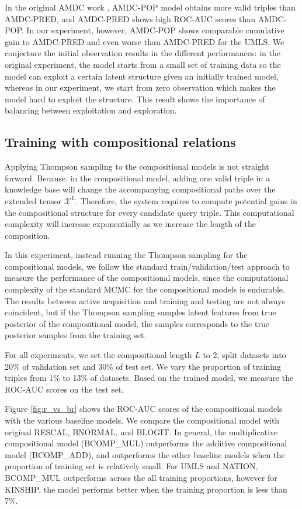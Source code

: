 In the original AMDC work \cite{kajino2015active}, AMDC-POP model obtains more 
valid triples than AMDC-PRED, and AMDC-PRED shows high ROC-AUC scores than AMDC-POP. 
In our experiment, however, AMDC-POP shows comparable cumulative gain to AMDC-PRED 
and even worse than AMDC-PRED for the UMLS. We conjecture the initial observation 
results in the  different performances: in the original experiment, the model starts
from a small set of training data so the model can exploit a certain latent structure 
given an initially trained model, whereas in our experiment, we start from zero 
observation which makes the model hard to exploit the structure. This result shows 
the importance of balancing between exploitation and exploration.

\subsection{Training with compositional relations}
Applying Thompson sampling to the compositional models is not straight forward. 
Because, in the compositional model, adding one valid triple in a knowledge base will 
change the accompanying compositional paths over the extended tensor $\mathcal{X}^L$. 
Therefore, the system requires to compute potential gains in the 
compositional structure for every candidate query triple. This computational complexity 
will increase exponentially as we increase the length of the composition.

In this experiment, instead running the Thompson sampling for the compositional models,
we follow the standard train/validation/test approach to measure the performance of the compositional models, since the computational complexity of the standard MCMC for the compositional models is endurable. 
The results between active acquisition and training and testing are not always coincident, but if the Thompson sampling samples latent features from true posterior of the compositional model, the samples corresponds to the true posterior samples from the training set.

For all experiments, we set the compositional length $L$ to 2, split datasets into 20\% of validation set and 30\% of test set. We vary the proportion of training triples
from 1\% to 13\% of datasets. Based on the trained model, we measure the ROC-AUC scores on the test set.

Figure \ref{fig:r_vs_br} shows the ROC-AUC scores of the compositional models with the various baseline models. We compare the compositional model with original RESCAL, BNORMAL, and BLOGIT. In general, the multiplicative compositional model (BCOMP\_MUL) outperforms the additive compositional model (BCOMP\_ADD), and outperforms the other baseline models when the proportion of training set is relatively small. For UMLS and NATION, BCOMP\_MUL outperforms across the all training proportions, however for KINSHIP, the model performs better when the training proportion is less than 7\%.

